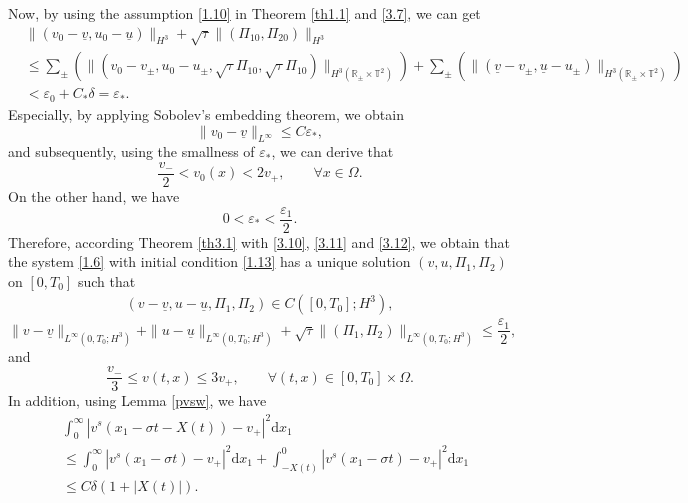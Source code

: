 \documentclass[10pt,reqno]{amsart}
\numberwithin{equation}{section}
\newcommand{\dif}{\mathrm{d}}
\begin{document}
Now, by using the assumption \eqref{1.10} in Theorem \ref{th1.1} and \eqref{3.7}, we can get
\begin{equation}\label{3.10}
\begin{aligned}
&\|(v_0-\underline{v},u_0-\underline{u})\|_{H^3}
+\sqrt{\tau}\|(\Pi_{10}, \Pi_{20})\|_{H^3}\\
&\le\sum\limits_{\pm}\left(\|(v_0-v_{\pm}, u_0-u_{\pm}, \sqrt{\tau}\Pi_{10}, \sqrt{\tau}\Pi_{10})\|
_{H^3(\mathbb{R}_{\pm}\times\mathbb{T}^2)}\right)
+\sum\limits_{\pm}\left(\|(\underline{v}-v_{\pm},\underline{u}-u_{\pm})\|
_{H^3(\mathbb{R}_{\pm}\times\mathbb{T}^2)}\right)
\\
&<\varepsilon_0+C_{\ast}\delta=\varepsilon_\ast.
\end{aligned}
\end{equation}
Especially, by applying Sobolev's embedding theorem, we obtain
\[
\|v_0-\underline{v}\|_{L^\infty}\le C\varepsilon_\ast,
\]
and subsequently, using the smallness of $\varepsilon_\ast$, we can derive that
\begin{equation}\label{3.11}
\frac{v_-}{2}<v_0(x)<2v_+,\qquad \forall x\in\Omega.
\end{equation}
On the other hand, we have
\begin{equation}\label{3.12}
0<\varepsilon_\ast<\frac{\varepsilon_1}{2}.
\end{equation}
Therefore, according Theorem \ref{th3.1} with \eqref{3.10}, \eqref{3.11} and \eqref{3.12}, we obtain that the system \eqref{1.6} with initial condition \eqref{1.13} has a unique solution $(v, u, \Pi_1, \Pi_2)$ on $[0,T_0]$ such that
\begin{equation}\nonumber
\begin{aligned}
(v-\underline{v}, u-\underline{u}, \Pi_1, \Pi_2)\in C([0,T_0];H^3),
\end{aligned}
\end{equation}
\begin{equation}\label{3.14}
\|v-\underline{v}\|_{L^{\infty}(0,T_0;H^3)}+\|u-\underline{u}\|_{L^{\infty}(0,T_0;H^3)}
+\sqrt{\tau}\|(\Pi_1, \Pi_2)\|_{L^{\infty}(0,T_0;H^3)}\leq \frac{\varepsilon_1}{2},
\end{equation}
and
\begin{equation}\nonumber
\frac{v_-}{3}\leq v(t,x)\leq 3v_+,\qquad \forall(t,x)\in[0,T_0]\times\Omega.
\end{equation}
In addition, using Lemma \ref{pvsw}, we have
\begin{align*}
&\int_0^\infty |v^s(x_1-\sigma t-X(t))-v_+|^2\dif x_1\\
&\le \int_0^\infty |v^s(x_1-\sigma t)-v_+|^2\dif x_1
+\int_{-X(t)}^0 |v^s(x_1-\sigma t)-v_+|^2\dif x_1\\
&\le C\delta(1+|X(t)|).
\end{align*}
\end{document}

